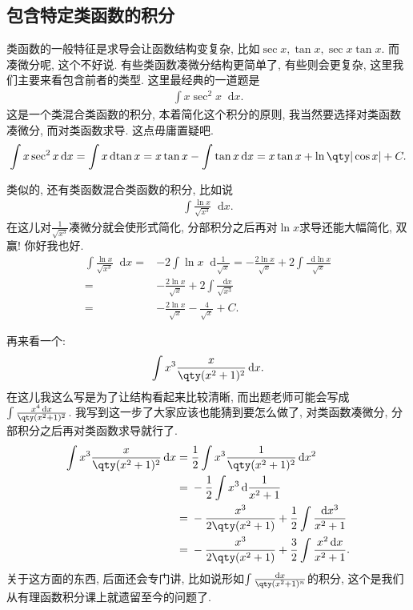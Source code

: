 \documentclass{ctexbook}
\newcommand*{\dif}{\mathop{}\!\mathrm{d}}
\begin{document}
{\subsection{包含特定\uppercase\expandafter{}类函数的积分}
\uppercase\expandafter{}类函数的一般特征是求导会让函数结构变复杂, 比如$\sec{x},\tan{x},\sec{x}\tan{x}$. 而凑微分呢, 这个不好说. 有些\uppercase\expandafter{}类函数凑微分结构更简单了, 有些则会更复杂, 这里我们主要来看包含前者的类型. 这里最经典的一道题是
\begin{align*}
\int x\sec^{2}{x}\dif{x}
.\end{align*}
这是一个\uppercase\expandafter{}类混合\uppercase\expandafter{}类函数的积分, 本着简化这个积分的原则, 我当然要选择对\uppercase\expandafter{}类函数凑微分, 而对\uppercase\expandafter{}类函数求导. 这点毋庸置疑吧. 
\begin{align*}
\int x\sec^{2}{x}\dif{x}=\int x\dif{\tan{x}}=x\tan{x}-\int\tan{x}\dif{x}=x\tan{x}+\ln\qty|\cos{x}|+C
.\end{align*}\par
类似的, 还有\uppercase\expandafter{}类函数混合\uppercase\expandafter{}类函数的积分, 比如说
\begin{align*}
\int\frac{\ln{x}}{\sqrt{x^{3}}}\dif{x}
.\end{align*}
在这儿对$\frac{1}{\sqrt{x^{3}}}$凑微分就会使形式简化, 分部积分之后再对$\ln{x}$求导还能大幅简化, 双赢! 你好我也好. 
\begin{align*}
\int\frac{\ln{x}}{\sqrt{x^{3}}}\dif{x}={}&-2\int\ln{x}\dif{\frac{1}{\sqrt{x}}}=-\frac{2\ln{x}}{\sqrt{x}}+2\int\frac{\dif{\ln{x}}}{\sqrt{x}}\\
={}&-\frac{2\ln{x}}{\sqrt{x}}+2\int\frac{\dif{x}}{\sqrt{x^{3}}}\\
={}&-\frac{2\ln{x}}{\sqrt{x}}-\frac{4}{\sqrt{x}}+C
.\end{align*}\par
再来看一个: 
\begin{align*}
\int x^{3}\frac{x}{\qty(x^{2}+1)^{2}}\dif{x}
.\end{align*}
在这儿我这么写是为了让结构看起来比较清晰, 而出题老师可能会写成$\int\frac{x^{4}\dif{x}}{\qty(x^{2}+1)^{2}}$. 我写到这一步了大家应该也能猜到要怎么做了, 对\uppercase\expandafter{}类函数凑微分, 分部积分之后再对\uppercase\expandafter{}类函数求导就行了. 
\begin{align*}
\int x^{3}\frac{x}{\qty(x^{2}+1)^{2}}\dif{x}={}&\frac{1}{2}\int x^{3}\frac{1}{\qty(x^{2}+1)^{2}}\dif{x^{2}}\\
={}&-\frac{1}{2}\int x^{3}\dif{\frac{1}{x^{2}+1}}\\
={}&-\frac{x^{3}}{2\qty(x^{2}+1)}+\frac{1}{2}\int\frac{\dif{x^{3}}}{x^{2}+1}\\
={}&-\frac{x^{3}}{2\qty(x^{2}+1)}+\frac{3}{2}\int\frac{x^{2}\dif{x}}{x^{2}+1}
.\end{align*}
关于这方面的东西, 后面还会专门讲, 比如说形如$\int\frac{\dif{x}}{\qty(x^{2}+1)^{n}}$的积分, 这个是我们从有理函数积分课上就遗留至今的问题了. \par
}
\end{document}
